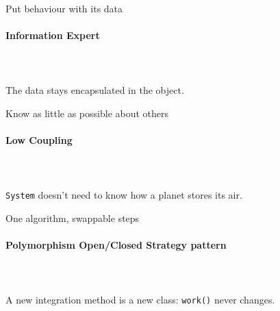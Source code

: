 \begin{frame}[fragile]{Put behaviour with its data}
    \framesubtitle{Information Expert}

    \begin{columns}[T]
        \beforelabel
        \inputminted{python}{code/design/behaviour_with_data_before.py}

        \pause
        \afterlabel
        \inputminted{python}{code/design/behaviour_with_data_after.py}
    \end{columns}

    \vfill

    \begin{center}
    The data stays encapsulated in the object.
    \end{center}
\end{frame}




\begin{frame}[fragile]{Know as little as possible about others}
    \framesubtitle{Low Coupling}

    \begin{columns}[T]
        \beforelabel
        \inputminted{python}{code/design/know_little_before.py}

        \pause
        \afterlabel
        \inputminted{python}{code/design/know_little_after.py}
    \end{columns}

    \vfill

    \begin{center}
    \texttt{System} doesn't need to know how a planet stores its air.
    \end{center}
\end{frame}




\begin{frame}[fragile]{One algorithm, swappable steps}
    \framesubtitle{Polymorphism \textperiodcentered{} Open/Closed \textperiodcentered{} Strategy pattern}

    \begin{columns}[T]
        \beforelabel
        \inputminted[highlightlines={3,8}]{python}{code/design/strategy_before.py}

        \pause
        \afterlabel
        \inputminted[highlightlines={1,3}]{python}{code/design/strategy_after.py}
    \end{columns}

    \vfill

    \begin{center}
    A new integration method is a new class: \texttt{work()} never changes.
    \end{center}
\end{frame}




